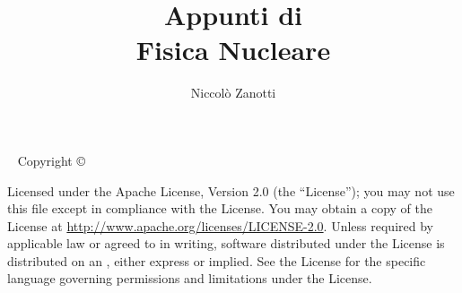 \documentclass{tufte-book} %
\title{Appunti di\\Fisica Nucleare} %
\author{Niccolò Zanotti} %
\theoremstyle{definition}
\theoremstyle{theorem}
\theoremstyle{plain}
\theoremstyle{remark}
\theoremstyle{remark}
\newcommand{\monthyear}{\ifcase\month\or January\or February\or March\or April\or May\or June\or July\or August\or September\or October\or November\or December\fi\space\number\year} %
\newcommand{\openepigraph}[2]{ %
\begin{fullwidth}
\sffamily\large
\begin{doublespace}
\noindent\allcaps{#1}\\ %
\noindent\allcaps{#2} %
\end{doublespace}
\end{fullwidth}
}
\begin{document}
\frontmatter




\maketitle %


\newpage
\begin{fullwidth}
~\vfill
\thispagestyle{empty}
\setlength{\parindent}{0pt}
\setlength{\parskip}{\baselineskip}
Copyright \copyright\ \the\year\ \thanklessauthor

\par{}

\par{}

\par Licensed under the Apache License, Version 2.0 (the ``License'');
you may not use this file except in compliance with the License.
You may obtain a copy of the License at \url{http://www.apache.org/licenses/LICENSE-2.0}.
Unless required by applicable law or agreed to in writing, software
distributed under the License is distributed on an , either express or implied.
See the License for the specific language governing permissions and
limitations under the License.

\end{fullwidth}


\tableofcontents %
\end{document}
